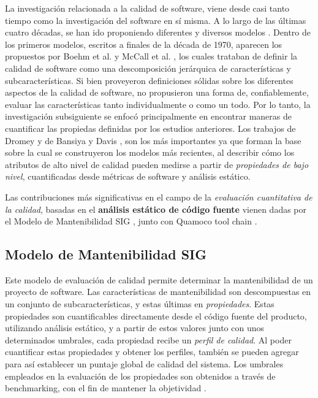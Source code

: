 La investigación relacionada a la calidad de software, viene desde casi tanto tiempo como
la investigación del software en sí misma.
A lo largo de las últimas cuatro décadas, se han ido proponiendo diferentes y diversos 
modelos \cite{Deissenboeck2009}.
Dentro de los primeros modelos, escritos a finales de la década de 1970, aparecen los
propuestos por Boehm et al. \cite{Boehm1978} y McCall et al. \cite{McCall1977}, los cuales trataban
de definir la calidad de software como una descomposición jerárquica de características y
subcaracterísticas.
Si bien proveyeron definiciones sólidas sobre los diferentes aspectos de la calidad de software,
no propusieron una forma de, confiablemente, evaluar las características tanto individualmente
o como un todo.
Por lo tanto, la investigación subsiguiente se enfocó principalmente en encontrar maneras de
cuantificar las propiedas definidas por los estudios anteriores.
Los trabajos de Dromey \cite{Dromey1995} y de Bansiya y Davis \cite{Bansiya2002}, son los más 
importantes ya que forman la base sobre la cual se construyeron los modelos más recientes, al 
describir cómo los atributos de alto nivel de calidad pueden medirse a partir de \textit{propiedades
de bajo nivel}, cuantificadas desde métricas de software y análisis estático.

Las contribuciones más significativas en el campo de la \textit{evaluación cuantitativa de la calidad},
basadas en el \textbf{análisis estático de código fuente} vienen dadas por el Modelo de Mantenibilidad 
SIG \cite{Heitlager2007}, junto con Quamoco tool chain \cite{Wagner2012}.

\subsection{Modelo de Mantenibilidad SIG}

Este modelo de evaluación de calidad \cite{Heitlager2007} permite determinar la mantenibilidad
de un proyecto de software.
Las características de mantenibilidad son descompuestas en un conjunto de subcaracterísticas,
y estas últimas en \textit{propiedades}.
Estas propiedades son cuantificables directamente desde el código fuente del producto, utilizando
análisis estático, y a partir de estos valores junto con unos determinados umbrales,
cada propiedad recibe un \textit{perfil de calidad}.
Al poder cuantificar estas propiedades y obtener los perfiles, también se pueden agregar
para así establecer un puntaje global de calidad del sistema.
Los umbrales empleados en la evaluación de los propiedades son obtenidos a través de
benchmarking, con el fin de mantener la objetividad \cite{Alves2010}.

